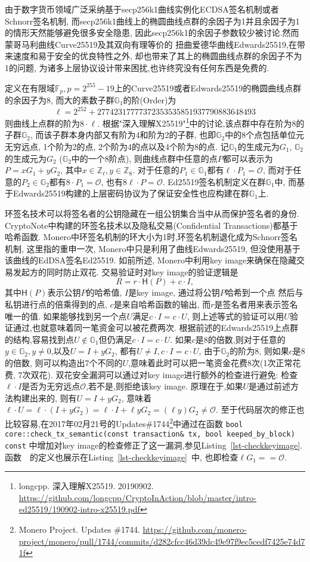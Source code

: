 \documentclass{article}
\renewcommand{\G}{\mathbb{G}}
\newcommand{\Z}{\mathbb{Z}}
\newcommand{\F}{\mathbb{F}}
\newcommand{\code}[1]{\lstinline!#1!}
\begin{document}
由于数字货币领域广泛采纳基于secp256k1曲线实例化ECDSA签名机制或者Schnorr签名机制,
而secp256k1曲线上的椭圆曲线点群的余因子为1并且余因子为1的情形天然能够避免很多安全隐患,
因此secp256k1的余因子参数较少被讨论.然而蒙哥马利曲线Curve25519及其双向有理等价的
扭曲爱德华曲线Edwards25519,在带来速度和易于安全的优良特性之外,
却也带来了其上的椭圆曲线点群的余因子不为1的问题,
为诸多上层协议设计带来困扰,也许终究没有任何东西是免费的.

定义在有限域$\F_p, p = 2^{255}-19$上的Curve25519或者Edwards25519的椭圆曲线点群的余因子为8,
而大的素数子群$\G_1$的阶(Order)为
$$\ell = 2^{252} + 27742317777372353535851937790883648493$$
则曲线上点群的阶为$8\cdot\ell$. 根据"深入理解X25519"\footnote{
longcpp. 深入理解X25519. 20190902. 
\url{https://github.com/longcpp/CryptoInAction/blob/master/intro-ed25519/190902-intro-x25519.pdf}}中的讨论,该点群中存在阶为8的子群$\G_2$, 而该子群本身内部又有阶为4和阶为2的子群,
也即$\G_2$中的8个点包括单位元无穷远点, 1个阶为2的点, 2个阶为4的点以及4个阶为8的点.
记$\G_1$的生成元为$G_1$, $\G_2$的生成元为$G_2$ ($\G_2$中的一个8阶点), 
则曲线点群中任意的点$P$都可以表示为$P = xG_1 + yG_2$, 其中$x\in \Z_\ell, y\in\Z_8$. 
对于任意的$P_1 \in \G_1$都有$\ell \cdot P_1 = \mathcal{O}$, 
而对于任意的$P_2 \in \G_2$都有$8 \cdot P_1 = \mathcal{O}$, 
也有$8\ell\cdot P = \mathcal{O}$. Ed25519签名机制定义在群$\G_1$中, 
而基于Edwards25519构建的上层密码协议为了保证安全性也应构建在群$\G_1$上.

环签名技术可以将签名者的公钥隐藏在一组公钥集合当中从而保护签名者的身份.
CryptoNote中构建的环签名技术以及隐私交易(Confidential Transactions)都基于哈希函数.
Monero中环签名机制的环大小为1时,环签名机制退化成为Schnorr签名机制, 
这里指的重申一次, Monero中只是利用了曲线Edwards25519, 但没使用基于该曲线的EdDSA签名Ed25519.
如前所述, Monero中利用key image来确保在隐藏交易发起方的同时防止双花.
交易验证时对key image的验证逻辑是
$$R = r\cdot \textsf{H}(P) + c\cdot I,$$
其中$\textsf{H}(P)$表示公钥$P$的哈希值, $I$是key image, 通过将公钥$P$哈希到一个点
然后与私钥进行点的倍乘得到的点, $c$是来自哈希函数的输出, 
而$r$是签名者用来表示签名唯一的值. 如果能够找到另一个点$U$满足$c\cdot I = c\cdot U$,
则上述等式的验证可以用$U$验证通过,也就意味着同一笔资金可以被花费两次.
根据前述的Edwards25519上点群的结构,容易找到点$U\notin\G_1$但仍满足$c\cdot I = c\cdot U$.
如果$c$是8的倍数,则对于任意的$y\in \G_2, y\neq 0$,以及$U = I + yG_2$,
都有$U\neq I,  c\cdot I = c\cdot U$, 由于$\G_2$的阶为8, 则如果$c$是8的倍数,
则可以构造出7个不同的$U$,意味着此时可以把一笔资金花费8次(1次正常花费, 7次双花).
双花安全漏洞可以通过对key image进行额外的检查进行避免: 
检查$\ell \cdot I$是否为无穷远点$\mathcal{O}$,若不是,则拒绝该key image.
原理在于,如果$U$是通过前述方法构建出来的, 则有$U = I + yG_2$, 意味着
$\ell\cdot U = \ell\cdot(I + yG_2) = \ell\cdot I + \ell y G_2 = (\ell y)G_2 \neq \mathcal{O}$.
至于代码层次的修正也比较容易,在2017年02月21号的Updates\#1744\footnote{
Monero Project. Updates \#1744.
\url{https://github.com/monero-project/monero/pull/1744/commits/d282cfcc46d39dc49e97f9ec5cedf7425e74d71f}}中通过在函数
\code{bool core::check_tx_semantic(const transaction& tx, bool keeped_by_block) const}
中增加对key image的检查修正了这一漏洞,参见Listing~\ref{lst-checkkeyimage}. 
函数~\code{}~的定义也展示在Listing~\ref{lst-checkkeyimage}~中, 
也即检查$\ell G_1 == \mathcal{O}$.
\end{document}

